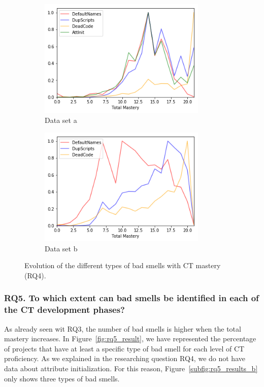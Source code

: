 \begin{figure}
    \begin{subfigure}{.5\textwidth}
    \centering
    \includegraphics[width=8cm]{img/rq4_dataset_a.png}
    \caption{Data set a}
    \label{subfig:rq4_results_a}
  \end{subfigure}
  \begin{subfigure}{.5\textwidth}
    \centering
    \includegraphics[width=8cm]{img/rq4_dataset_b.png}
    \caption{Data set b}
    \label{subfig:rq4_results_b}
  \end{subfigure}
    \caption{Evolution of the different types of bad smells with CT mastery (RQ4).}
    \label{fig:rq4_result}
\end{figure}


\subsubsection{RQ5. To which extent can bad smells be identified in each of the CT development phases?}
\label{subsubsec:rq5_results}

As already seen wit RQ3, the number of bad smells is higher when the total mastery increases. In Figure~\ref{fig:rq5_result}, we have represented the percentage of projects that have at least a specific type of bad smell for each level of CT proficiency. As we explained in the researching question RQ4, we do not have data about attribute initialization. For this reason, Figure~\ref{subfig:rq5_results_b} only shows three types of bad smells.

